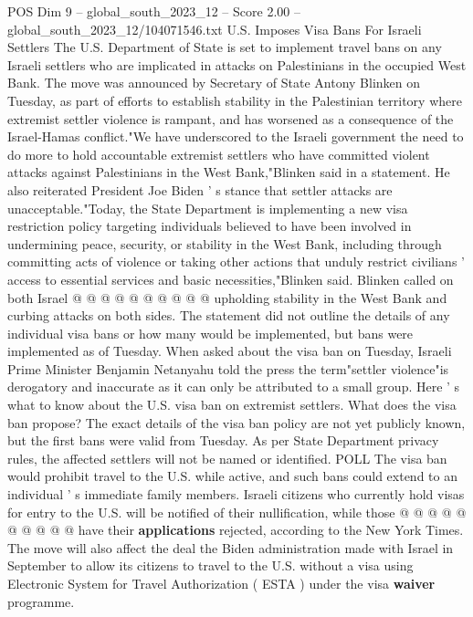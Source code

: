 \begin{textsample}{POS Dim 9 – global\_south\_2023\_12 – Score 2.00 – global\_south\_2023\_12/104071546.txt}  \label{ex:f9_pos_137}
U.S.
Imposes Visa Bans For Israeli Settlers The U.S.
Department of State is set to implement travel bans on any Israeli settlers who are implicated in attacks on Palestinians in the occupied West Bank.
The move was announced by Secretary of State Antony Blinken on Tuesday, as part of efforts to establish stability in the Palestinian territory where extremist settler violence is rampant, and has worsened as a consequence of the Israel-Hamas conflict."We have underscored to the Israeli government the need to do more to hold accountable extremist settlers who have committed violent attacks against Palestinians in the West Bank,"Blinken said in a statement.
He also reiterated President Joe Biden ' s stance that settler attacks are unacceptable."Today, the State Department is implementing a new visa restriction policy targeting individuals believed to have been involved in undermining peace, security, or stability in the West Bank, including through committing acts of violence or taking other actions that unduly restrict civilians ' access to essential services and basic necessities,"Blinken said.
Blinken called on both Israel @ @ @ @ @ @ @ @ @ @ upholding stability in the West Bank and curbing attacks on both sides.
The statement did not outline the details of any individual visa bans or how many would be implemented, but bans were implemented as of Tuesday.
When asked about the visa ban on Tuesday, Israeli Prime Minister Benjamin Netanyahu told the press the term"settler violence"is derogatory and inaccurate as it can only be attributed to a small group.
Here ' s what to know about the U.S. visa ban on extremist settlers.
What does the visa ban propose?
The exact details of the visa ban policy are not yet publicly known, but the first bans were valid from Tuesday.
As per State Department privacy rules, the affected settlers will not be named or identified.
POLL The visa ban would prohibit travel to the U.S. while active, and such bans could extend to an individual ' s immediate family members.
Israeli citizens who currently hold visas for entry to the U.S. will be notified of their nullification, while those @ @ @ @ @ @ @ @ @ @ have their \textbf{applications} rejected, according to the New York Times.
The move will also affect the deal the Biden administration made with Israel in September to allow its citizens to travel to the U.S. without a visa using Electronic System for Travel Authorization ( ESTA ) under the visa \textbf{waiver} programme.

\end{textsample}
